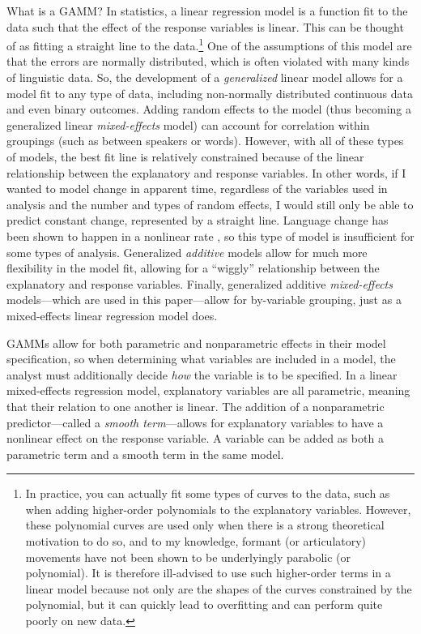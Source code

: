What is a GAMM? In statistics, a linear regression model is a function fit to the data such that the effect of the response variables is linear. This can be thought of as fitting a straight line to the data.\footnote{In practice, you can actually fit some types of curves to the data, such as when adding higher-order polynomials to the explanatory variables. However, these polynomial curves are used only when there is a strong theoretical motivation to do so, and to my knowledge, formant (or articulatory) movements have not been shown to be underlyingly parabolic (or polynomial). It is therefore ill-advised to use such higher-order terms in a linear model because not only are the shapes of the curves constrained by the polynomial, but it can quickly lead to overfitting and can perform quite poorly on new data.} One of the assumptions of this model are that the errors are normally distributed, which is often violated with many kinds of linguistic data. So, the development of a \textit{generalized} linear model allows for a model fit to any type of data, including non-normally distributed continuous data and even binary outcomes. Adding random effects to the model (thus becoming a generalized linear \textit{mixed-effects} model) can account for correlation within groupings (such as between speakers or words). However, with all of these types of models, the best fit line is relatively constrained because of the linear relationship between the explanatory and response variables. In other words, if I wanted to model change in apparent time, regardless of the variables used in analysis and the number and types of random effects, I would still only be able to predict constant change, represented by a straight line. Language change has been shown to happen in a nonlinear rate \citep[cf.][]{fruehwald_2017}, so this type of model is insufficient for some types of analysis. Generalized \textit{additive} models allow for much more flexibility in the model fit, allowing for a ``wiggly'' relationship between the explanatory and response variables. Finally, generalized additive \textit{mixed-effects} models---which are used in this paper---allow for by-variable grouping, just as a mixed-effects linear regression model does.

GAMMs allow for both parametric and nonparametric effects in their model specification, so when determining what variables are included in a model, the analyst must additionally decide \textit{how} the variable is to be specified. In a linear mixed-effects regression model, explanatory variables are all parametric, meaning that their relation to one another is linear. The addition of a nonparametric predictor---called a \textit{smooth term}---allows for explanatory variables to have a nonlinear effect on the response variable. A variable can be added as both a parametric term and a smooth term in the same model.

